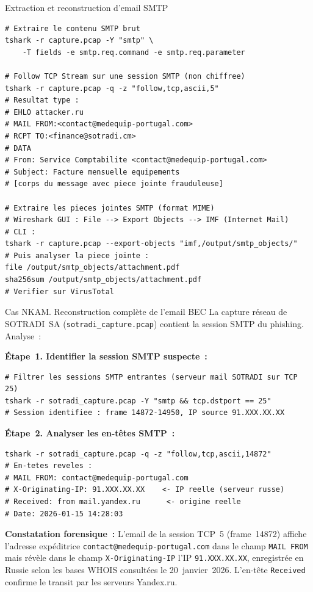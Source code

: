 \begin{boxoutils}{Extraction et reconstruction d'email SMTP}
\begin{lstlisting}[language=bash_forensique]
# Extraire le contenu SMTP brut
tshark -r capture.pcap -Y "smtp" \
    -T fields -e smtp.req.command -e smtp.req.parameter

# Follow TCP Stream sur une session SMTP (non chiffree)
tshark -r capture.pcap -q -z "follow,tcp,ascii,5"
# Resultat type :
# EHLO attacker.ru
# MAIL FROM:<contact@medequip-portugal.com>
# RCPT TO:<finance@sotradi.cm>
# DATA
# From: Service Comptabilite <contact@medequip-portugal.com>
# Subject: Facture mensuelle equipements
# [corps du message avec piece jointe frauduleuse]

# Extraire les pieces jointes SMTP (format MIME)
# Wireshark GUI : File --> Export Objects --> IMF (Internet Mail)
# CLI :
tshark -r capture.pcap --export-objects "imf,/output/smtp_objects/"
# Puis analyser la piece jointe :
file /output/smtp_objects/attachment.pdf
sha256sum /output/smtp_objects/attachment.pdf
# Verifier sur VirusTotal
\end{lstlisting}
\end{boxoutils}

\begin{boxscenario}{Cas NKAM. Reconstruction complète de l'email BEC}
La capture réseau de SOTRADI~SA (\texttt{sotradi\_capture.pcap})
contient la session SMTP du phishing. Analyse~:

\textbf{Étape~1. Identifier la session SMTP suspecte~:}
\begin{lstlisting}[language=bash_forensique]
# Filtrer les sessions SMTP entrantes (serveur mail SOTRADI sur TCP 25)
tshark -r sotradi_capture.pcap -Y "smtp && tcp.dstport == 25"
# Session identifiee : frame 14872-14950, IP source 91.XXX.XX.XX
\end{lstlisting}

\textbf{Étape~2. Analyser les en-têtes SMTP~:}
\begin{lstlisting}[language=bash_forensique]
tshark -r sotradi_capture.pcap -q -z "follow,tcp,ascii,14872"
# En-tetes reveles :
# MAIL FROM: contact@medequip-portugal.com
# X-Originating-IP: 91.XXX.XX.XX    <- IP reelle (serveur russe)
# Received: from mail.yandex.ru      <- origine reelle
# Date: 2026-01-15 14:28:03
\end{lstlisting}

\textbf{Constatation forensique~:}
L'email de la session TCP~5 (frame~14872) affiche l'adresse expéditrice
\texttt{contact@medequip-portugal.com} dans le champ \texttt{MAIL FROM}
mais révèle dans le champ \texttt{X-Originating-IP} l'IP
\texttt{91.XXX.XX.XX}, enregistrée en Russie selon les bases WHOIS
consultées le 20~janvier~2026. L'en-tête \texttt{Received} confirme
le transit par les serveurs Yandex.ru.
\end{boxscenario}

